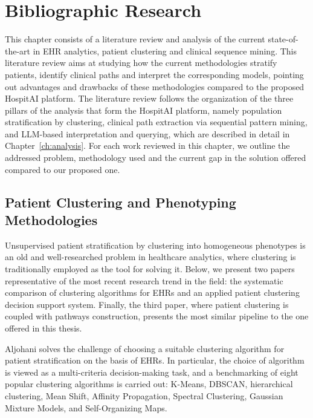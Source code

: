 \chapter{Bibliographic Research}\label{ch:research}

\pagestyle{fancy}

This chapter consists of a literature review and analysis of the current state-of-the-art in EHR analytics, patient clustering and clinical sequence mining. This literature review aims at studying how the current methodologies stratify patients, identify clinical paths and interpret the corresponding models, pointing out advantages and drawbacks of these methodologies compared to the proposed HospitAI platform. The literature review follows the organization of the three pillars of the analysis that form the HospitAI platform, namely population stratification by clustering, clinical path extraction via sequential pattern mining, and LLM-based interpretation and querying, which are described in detail in Chapter~\ref{ch:analysis}. For each work reviewed in this chapter, we outline the addressed problem, methodology used and the current gap in the solution offered compared to our proposed one.

\section{Patient Clustering and Phenotyping Methodologies}\label{sec:rw_clustering}

Unsupervised patient stratification by clustering into homogeneous phenotypes is an old and well-researched problem in healthcare analytics, where clustering is traditionally employed as the tool for solving it. Below, we present two papers representative of the most recent research trend in the field: the systematic comparison of clustering algorithms for EHRs and an applied patient clustering decision support system. Finally, the third paper, where patient clustering is coupled with pathways construction, presents the most similar pipeline to the one offered in this thesis.

Aljohani \cite{aljohani2024} solves the challenge of choosing a suitable clustering algorithm for patient stratification on the basis of EHRs. In particular, the choice of algorithm is viewed as a multi-criteria decision-making task, and a benchmarking of eight popular clustering algorithms is carried out: K-Means, DBSCAN, hierarchical clustering, Mean Shift, Affinity Propagation, Spectral Clustering, Gaussian Mixture Models, and Self-Organizing Maps.


